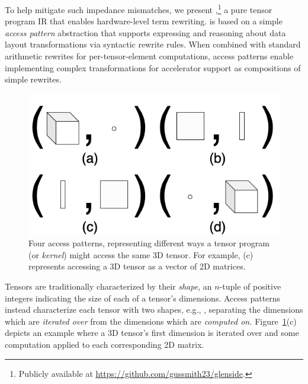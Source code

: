 To help mitigate such impedance mismatches,
  we present \textit{\g},\footnote{Publicly available at \url{https://github.com/gussmith23/glenside}.}
  a pure tensor program IR
  that enables hardware-level term rewriting.
\g is based on a simple
  \textit{access pattern} abstraction that
  supports expressing and reasoning about
  data layout transformations via
  syntactic rewrite rules.
When combined with standard arithmetic rewrites
  for per-tensor-element computations,
  access patterns enable implementing complex
  transformations for accelerator support as
  compositions of simple rewrites.

\begin{figure}
    \centering
    \includegraphics[width=.6\linewidth]{glenside/access-pattern-examples-2x2.png}
    \caption{
      Four access patterns,
        representing different ways
        a
        tensor program
        (or \textit{kernel})
        might access
        the same 3D tensor. 
      For example, (c) represents
        accessing a 3D tensor as
        a vector of 2D matrices.}
    \label{fig:access-pattern-examples}
    \vspace{-1em}
\end{figure}

Tensors are traditionally characterized
  by their \textit{shape},
  an $n$-tuple 
  of positive integers
  indicating the size of each
  of a tensor's dimensions.
Access patterns instead characterize
  each tensor with two shapes, e.g.,
  , separating
  the dimensions which are \textit{iterated over} from
  the dimensions which are \textit{computed on.}
Figure~\ref{fig:access-pattern-examples}(c)
  depicts an example where a 3D tensor's
  first dimension is iterated over and
  some computation applied to each
  corresponding 2D matrix.

